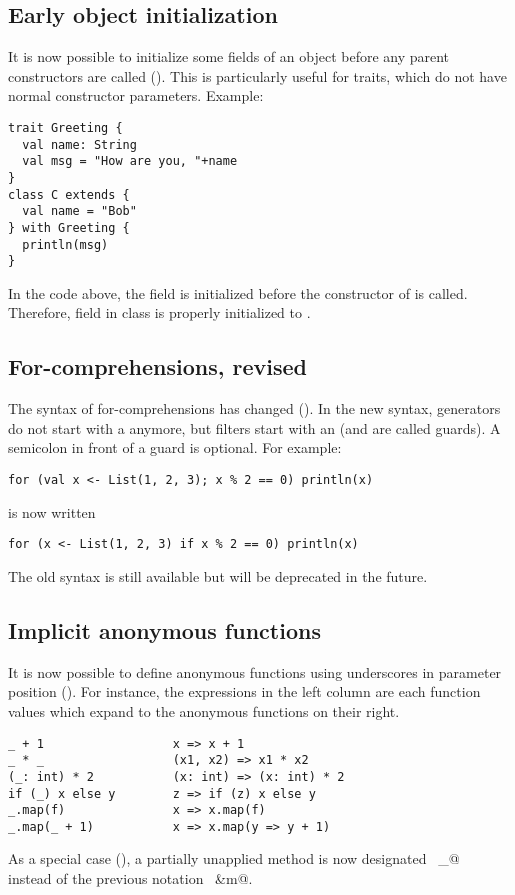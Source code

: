 \subsection*{Early object initialization}

It is now possible to initialize some fields of an object before any
parent constructors are called (). This is particularly useful for
traits, which do not have normal constructor parameters. Example:
\begin{lstlisting}
trait Greeting {
  val name: String
  val msg = "How are you, "+name
}
class C extends {
  val name = "Bob"
} with Greeting {
  println(msg)
}
\end{lstlisting}
In the code above, the field  is initialized before the
constructor of  is called. Therefore, field \lstinline@msg@ in
class  is properly initialized to .

\subsection*{For-comprehensions, revised}

The syntax of for-comprehensions has changed
(). In the new syntax, generators do not
start with a  anymore, but filters start with an 
(and are called guards). A semicolon in front of a guard is optional.
For example:

\begin{lstlisting}
for (val x <- List(1, 2, 3); x % 2 == 0) println(x)
\end{lstlisting}

is now written

\begin{lstlisting}
for (x <- List(1, 2, 3) if x % 2 == 0) println(x)
\end{lstlisting}

The old syntax is still available but will be deprecated in the
future. 

\subsection*{Implicit anonymous functions}

It is now possible to define anonymous functions 
using underscores in parameter position ().
For instance, 
the expressions in the left column are each function values which 
expand to the anonymous functions on their right.
\begin{lstlisting}
_ + 1                  x => x + 1
_ * _                  (x1, x2) => x1 * x2
(_: int) * 2           (x: int) => (x: int) * 2
if (_) x else y        z => if (z) x else y
_.map(f)               x => x.map(f)
_.map(_ + 1)           x => x.map(y => y + 1)
\end{lstlisting}
As a special case (), a partially unapplied method is now designated
~\lstinline@m _@~~ instead of the previous notation ~\lstinline@&m@.

